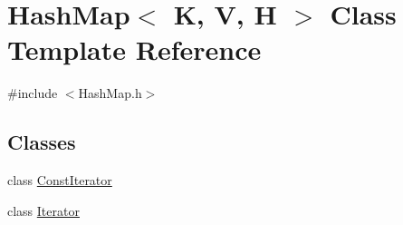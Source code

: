 \hypertarget{class_hash_map}{
\section{HashMap$<$ K, V, H $>$ Class Template Reference}
\label{class_hash_map}
}


{\ttfamily \#include $<$HashMap.h$>$}

\subsection*{Classes}
\begin{DoxyCompactItemize}
\item 
class \hyperlink{class_hash_map_1_1_const_iterator}{ConstIterator}
\item 
class \hyperlink{class_hash_map_1_1_iterator}{Iterator}
\end{DoxyCompactItemize}
